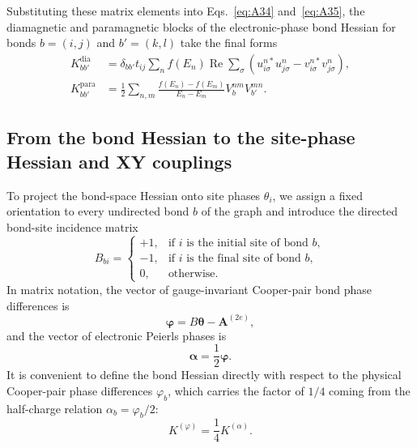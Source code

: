 \documentclass[aps,prb,twocolumn,superscriptaddress,floatfix]{revtex4-2}
\begin{document}
Substituting these matrix elements into Eqs.~\eqref{eq:A34} and~\eqref{eq:A35}, the diamagnetic and paramagnetic blocks of the electronic-phase bond Hessian for bonds $b = (i,j)$ and $b' = (k,l)$ take the final forms
\begin{align}
K_{bb'}^{\mathrm{dia}} &= \delta_{bb'} t_{ij} \sum_n f(E_n) \operatorname{Re}\sum_\sigma \left( u_{i\sigma}^{n*} u_{j\sigma}^n - v_{i\sigma}^{n*} v_{j\sigma}^n \right), \label{eq:A48} \\
K_{bb'}^{\mathrm{para}} &= \frac{1}{2}\sum_{n,m} \frac{f(E_n) - f(E_m)}{E_n - E_m} V_b^{nm} V_{b'}^{mn}. \label{eq:A49}
\end{align}

\subsection{From the bond Hessian to the site-phase Hessian and XY couplings}

To project the bond-space Hessian onto site phases $\theta_i$, we assign a fixed orientation to every undirected bond $b$ of the graph and introduce the directed bond-site incidence matrix
\begin{equation}
B_{bi} = \begin{cases}
+1, & \text{if } i \text{ is the initial site of bond } b, \\
-1, & \text{if } i \text{ is the final site of bond } b, \\
0, & \text{otherwise}.
\end{cases}
\label{eq:A50}
\end{equation}
In matrix notation, the vector of gauge-invariant Cooper-pair bond phase differences is
\begin{equation}
\bm{\varphi} = B\bm{\theta} - \bm{A}^{(2e)},
\label{eq:A51}
\end{equation}
and the vector of electronic Peierls phases is
\begin{equation}
\bm{\alpha} = \frac{1}{2}\bm{\varphi}.
\label{eq:A52}
\end{equation}
It is convenient to define the bond Hessian directly with respect to the physical Cooper-pair phase differences $\varphi_b$, which carries the factor of $1/4$ coming from the half-charge relation $\alpha_b = \varphi_b / 2$:
\begin{equation}
K^{(\varphi)} = \frac{1}{4} K^{(\alpha)}.
\label{eq:A53}
\end{equation}
\end{document}
